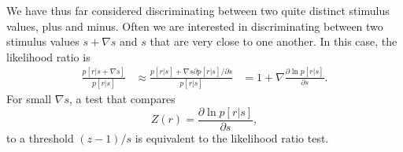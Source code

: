 \begin{exm}
  We have thus far considered discriminating between two quite distinct
stimulus values, plus and minus. Often we are interested in discriminating
between two stimulus values $s+\nabla s$ and $s$ that are very close to one another.
In this case, the likelihood ratio is
\begin{equation}
  \begin{aligned}
    \frac{p[r|s+\nabla s]}{p[r|s]} &\approx \frac{p[r|s]+\nabla
                                     s\partial p[r|s]/\partial s}{p[r|s]}
                                     &=1+\nabla \frac{\partial \ln
                                       p[r|s]}{\partial s}.
  \end{aligned}
\end{equation}
For small $\nabla s$, a test that compares
\begin{equation}
  \label{eq:3.19}
  Z(r)=\frac{\partial\ln p[r|s]}{\partial s},
\end{equation}
to a threshold $(z-1)/s$ is equivalent to the likelihood ratio test.
\end{exm}


